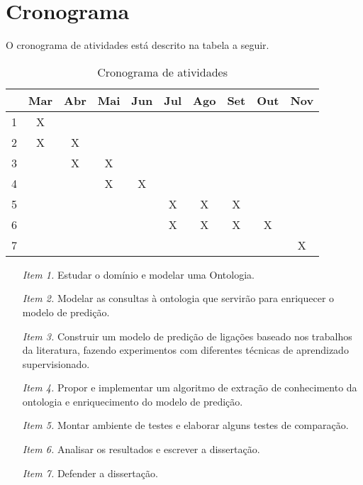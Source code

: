 \chapter{Cronograma}
\label{cap:cronograma}

O cronograma de atividades está descrito na tabela a seguir.

\begin{table}[h!]
    \centering
    \begin{tabular}{|c|c|c|c|c|c|c|c|c|c|}
     \hline
       & Mar & Abr & Mai & Jun & Jul & Ago & Set & Out & Nov \\
     \hline\hline
     1 & X &   &   &   &   &   &   &   &   \\
     \hline
     2 & X & X &   &   &   &   &   &   &   \\
     \hline
     3 &   & X & X &   &   &   &   &   &   \\
     \hline
     4 &   &   & X & X &   &   &   &   &   \\
     \hline
     5 &   &   &   &   & X & X & X &   &   \\
     \hline
     6 &   &   &   &   & X & X & X & X &   \\
     \hline
     7 &   &   &   &   &   &   &   &   & X \\
     \hline
    \end{tabular}
    \caption{Cronograma de atividades}
    \label{cronograma-atividades}
\end{table}

\begin{itemize}
    \item [\textit{Item 1.}] Estudar o domínio e modelar uma Ontologia.
    \item [\textit{Item 2.}] Modelar as consultas à ontologia que servirão para enriquecer o modelo de predição.
    \item [\textit{Item 3.}] Construir um modelo de predição de ligações baseado nos trabalhos da literatura, fazendo experimentos com diferentes técnicas de aprendizado supervisionado.
    \item [\textit{Item 4.}] Propor e implementar um algoritmo de extração de conhecimento da ontologia e enriquecimento do modelo de predição.
    \item [\textit{Item 5.}] Montar ambiente de testes e elaborar alguns testes de comparação.
    \item [\textit{Item 6.}] Analisar os resultados e escrever a dissertação.
    \item [\textit{Item 7.}] Defender a dissertação.

\end{itemize}
